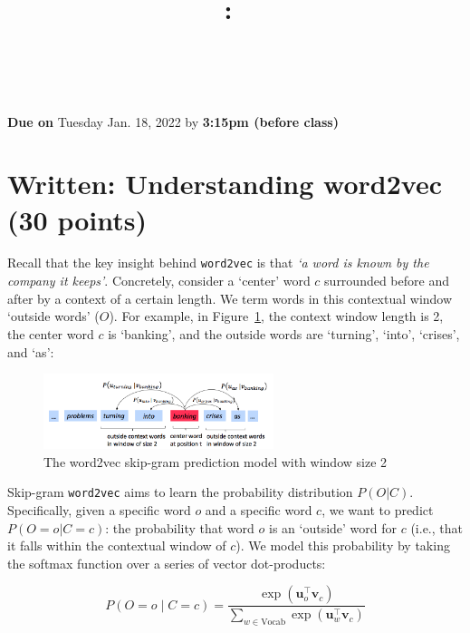 \documentclass{article}
\title{
\vspace{-1in}
\textmd{\textbf{\hmwkClass:\ \hmwkTitle} \\ \hmwkAuthorName}\\
}
\author{}
\date{}
\begin{document}
\maketitle
\vspace{-.7in}

\begin{center}
    \large{\textbf{Due on} Tuesday Jan. 18, 2022 by \textbf{3:15pm (before class)}}
\end{center}

\section{Written: Understanding word2vec (30 points)}
Recall that the key insight behind {\tt word2vec} is that \textit{`a word is known by the company it keeps'}. Concretely, consider a `center' word $c$ surrounded before and after by a context of a certain length. We term words in this contextual window `outside words' ($O$). For example, in Figure~\ref{fig:word2vec}, the context window length is 2, the center word $c$ is `banking', and the outside words are `turning', `into', `crises', and `as':

\begin{figure}[h]
    \centering
    \includegraphics[width=0.6\textwidth]{word2vec.png}
    \caption{The word2vec skip-gram prediction model with window size 2}
    \label{fig:word2vec}
\end{figure}

Skip-gram {\tt word2vec} aims to learn the probability distribution $P(O|C)$.
Specifically, given a specific word $o$ and a specific word $c$, we want to predict $P(O=o|C=c)$: the probability that word $o$ is an `outside' word for $c$ (i.e., that it falls within the contextual window of $c$).
We model this probability by taking the softmax function over a series of vector dot-products: %

\begin{equation}
    P(O=o \mid C=c) = \frac{\exp(\bm u_{o}^\top \bm v_c)}{\sum_{w \in \text{Vocab}} \exp(\bm u_{w}^\top \bm v_c)}
    \label{word2vec_condprob}
\end{equation}
\end{document}
